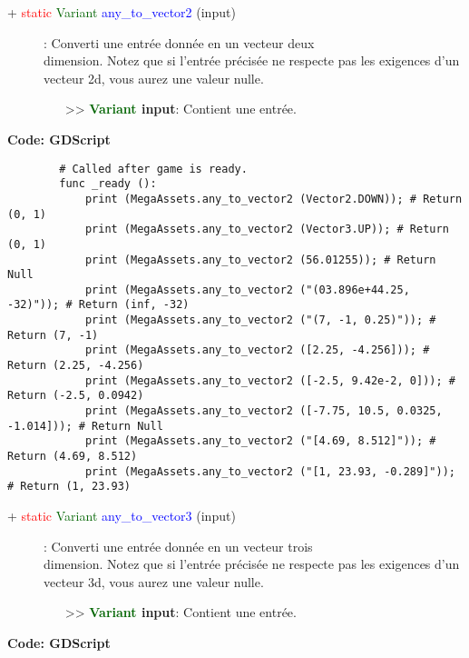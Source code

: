\documentclass[a4paper, 11pt]{article}
\begin{document}
	\begin{description}
		\item [+ \textcolor{red}{static} \textcolor{darkgreen}{Variant} \textcolor{blue}{any\_to\_vector2} 
		(input)]: Converti une entrée donnée en un vecteur deux \\dimension. Notez que si l'entrée précisée
		ne respecte pas les exigences d'un vecteur 2d, vous aurez une valeur nulle.
		\begin{itemize}
			\item [>> \textbf{\textcolor{darkgreen}{Variant} input}:] Contient une entrée.\\
		\end{itemize}
	\end{description}
	\textbf{Code: GDScript}
	\begin{lstlisting}
		# Called after game is ready.
		func _ready ():
			print (MegaAssets.any_to_vector2 (Vector2.DOWN)); # Return (0, 1)
			print (MegaAssets.any_to_vector2 (Vector3.UP)); # Return (0, 1)
			print (MegaAssets.any_to_vector2 (56.01255)); # Return Null
			print (MegaAssets.any_to_vector2 ("(03.896e+44.25, -32)")); # Return (inf, -32)
			print (MegaAssets.any_to_vector2 ("(7, -1, 0.25)")); # Return (7, -1)
			print (MegaAssets.any_to_vector2 ([2.25, -4.256])); # Return (2.25, -4.256)
			print (MegaAssets.any_to_vector2 ([-2.5, 9.42e-2, 0])); # Return (-2.5, 0.0942)
			print (MegaAssets.any_to_vector2 ([-7.75, 10.5, 0.0325, -1.014])); # Return Null
			print (MegaAssets.any_to_vector2 ("[4.69, 8.512]")); # Return (4.69, 8.512)
			print (MegaAssets.any_to_vector2 ("[1, 23.93, -0.289]")); # Return (1, 23.93)
	\end{lstlisting}
	\begin{description}
		\item [+ \textcolor{red}{static} \textcolor{darkgreen}{Variant} \textcolor{blue}{any\_to\_vector3} 
		(input)]: Converti une entrée donnée en un vecteur trois \\dimension. Notez que si l'entrée précisée 
		ne respecte pas les exigences d'un vecteur 3d, vous aurez une valeur nulle.
		\begin{itemize}
			\item [>> \textbf{\textcolor{darkgreen}{Variant} input}:] Contient une entrée.\\
		\end{itemize}
	\end{description}
	\textbf{Code: GDScript}
\end{document}
